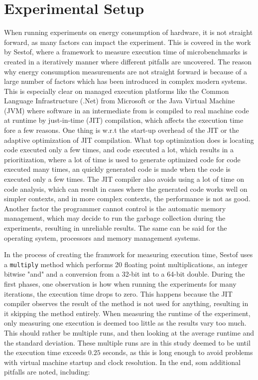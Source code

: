 
\section{Experimental Setup}

When running experiments on energy consumption of hardware, it is not straight forward, as many factors can impact the experiment. This is covered in the work by Sestof\cite*[]{sestoft2013microbenchmarks}, where a framework to measure execution time of microbenchmarks is created in a iteratively manner where different pitfalls are uncovered. The reason why energy consumption measurements are not straight forward is because of a large number of factors which has been introduced in complex modern systems. This is especially clear on managed execution platforms like the Common Language Infrastructure (.Net) from Microsoft or the Java Virtual Machine (JVM) where software in an intermediate from is compiled to real machine code at runtime by just-in-time (JIT) compilation, which affects the execution time fore a few reasons. One thing is w.r.t the start-up overhead of the JIT or the adaptive optimization of JIT compilation. What top optimization does is locating code executed only a few times, and code executed a lot, which results in a prioritization, where a lot of time is used to generate optimized code for code executed many times, an quickly generated code is made when the code is executed only a few times. The JIT compiler also avoids using a lot of time on code analysis, which can result in cases where the generated code works well on simpler contexts, and in more complex contexts, the performance is not as good. Another factor the programmer cannot control is the automatic memory management, which may decide to run the garbage collection during the experiments, resulting in unreliable results. The same can be said for the operating system, processors and memory management systems.

In the process of creating the framwork for measuring execution time, Sestof\cite*[]{sestoft2013microbenchmarks} uses a \texttt{multiply} method which performs 20  floating point multiplications, an integer bitwise "and" and a conversion from a 32-bit int to a 64-bit double. During the first phases, one observation is how when running the experiments for many iterations, the execution time drops to zero. This happens because the JIT compiler observes the result of the method is not used for anything, resulting in it skipping the method entirely. When measuring the runtime of the experiment, only measuring one execution is deemed too little as the results vary too much. This should rather be multiple runs, and then looking at the average runtime and the standard deviation. These multiple runs are in this study deemed to be until the execution time exceeds $0.25$ seconds, as this is long enough to avoid problems with virtual machine startup and clock resolution. In the end, som additional pitfalls are noted, including:


